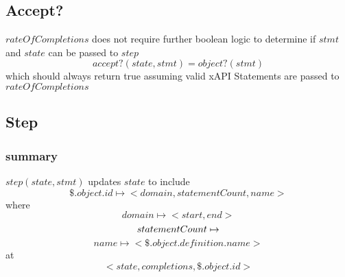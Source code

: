 \documentclass[../main.tex]{subfiles}
\begin{document}
\subsection{Accept?}
$rateOfCompletions$ does not require further boolean logic to determine if $stmt$ and $state$ can be passed to $step$
$$accept?(state, stmt) = object?(stmt)$$
which should always return true assuming valid xAPI Statements are passed to $rateOfCompletions$

\subsection{Step}
\subsubsection{summary}
$step(state, stmt)$ updates $state$ to include
$$\$.object.id \mapsto <domain, statementCount, name>$$
where
$$domain \mapsto <start, end> $$
$$statementCount \mapsto \real$$
$$name \mapsto <\$.object.definition.name>$$
at
$$<state, completions, \$.object.id>$$
\end{document}
